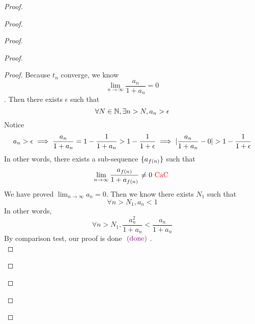\documentclass{report}
\begin{document}
\begin{proof}
\begin{proof}
\begin{proof}
\begin{proof}
\begin{proof}
Because $t_n$ converge, we know 
 \begin{equation}
\lim_{n\to\infty}\frac{a_n}{1+a_n}=0
\end{equation}
. Then there exists $\epsilon $ such that
\begin{equation}
\forall N\in\mathbb{N}, \exists n>N, a_n>\epsilon 
\end{equation}
Notice
\begin{equation}
a_n>\epsilon \implies \frac{a_n}{1+a_n}=1-\frac{1}{1+a_n}>1-\frac{1}{1+\epsilon }\implies \abso{\frac{a_n}{1+a_n}-0}>1-\frac{1}{1+\epsilon }
\end{equation}
In other words, there exists a sub-sequence $\{ a_{f(n)} \}$ such that
\begin{equation}
\lim_{n\to\infty}\frac{a_{f(n)}}{1+a_{f(n)}}\neq 0\text{ \textcolor{red}{CaC} }
\end{equation}
We have proved $\lim_{n\to\infty}a_n=0$. Then we know there exists $N_1$ such that
 \begin{equation}
\forall n>N_1, a_n<1
\end{equation}
In other words,
\begin{equation}
\forall n>N_1, \frac{a_n^2}{1+a_n}<\frac{a_n}{1+a_n}
\end{equation}
By comparison test, our proof is done $\textcolor{violet}{\text{ (done) }}$.\\


\end{proof}
\end{proof}
\end{proof}
\end{proof}
\end{proof}
\end{document}
